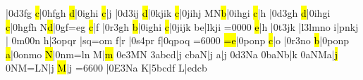 \temps\notes\hpause|\Ilegl0d\dqh3fg\enotes
\temps\notes{}\hl c|\qqh0hfgh\enotes
\xbarre\notes{}\hl d|\qqh0ighi\enotes
\temps\notes{}\hl c|\qu j\sk\enotes
\temps\notes|\Ilegl0d\dqh3ij\enotes
\xbarre\notes{}\hl d|\qqh0kjik\enotes
\temps\notes{}\hl c|\qqh0jihj\enotes
\xbarre\notes\zh M\lh N\hl b|\qqh0ihgi\enotes
\temps\notes{}\hl c|\qu h\enotes
\temps\notes|\Ilegl0d\dqh3gh\enotes
\alaligne\notes{}\hl d|\qqh0ihgi\enotes
\temps\notes{}\hl c|\qqh0hgfh\enotes
\barre\notes{}\lh N\hl d|\qqh0gf{=e}g\enotes
\temps\notes{}\hl c|\qu f\sk\enotes
\temps\notes|\Ilegu0r\dqh3gh\enotes
\barre\notes{}\hl b|\qqh0ighi\enotes
\temps\notes{}\hl c|\qqh0jijk\enotes
\barre\notes\zh b\bohl e|lkji\enotes
\cleftoksi={{0}{0}{0}{0}}\changeclefs
\temps\notes{}\hl e|\qu h\sk\enotes
\temps\notes|\Ilegu0t\dqh3jk\enotes
\alaligne\notes{}|\na l\qqb3lmno\enotes
\temps\notes{}\hu i|pnkj\enotes
\barre\nspace\notes{}|\relax
   \ibl0m0\tqb0n\enotes
\temps\notes{}\hu h|\qqb3opqr\enotes
\xbarre\notes{}|sq{=o}m\enotes
\temps\notes{}\hu f|\ql r\enotes
\temps\notes|\Ilegu0s\dqb4pr\enotes
\xbarre\notes{}\hu f|\qqB0qpoq\enotes
\cleftoksi={{6}{0}{0}{0}}\changeclefs
\temps\notes{}\hl{=e}|\qqB0ponp\enotes
\changecontexte
\Notes{}\hl c|\ql o\enotes
\temps\notes|\Ilegu0r\dqb3no\enotes
\temps\notes{}\hl b|\qqB0ponp\enotes
\temps\notes{}\hl a|\qqB0onmo\enotes
\generalmeter{\allabreve}\changecontexte
\notes{}\hl N|\qqB0nm{=l}n\enotes
\temps\Notes\boqu M|\hl m\enotes
\temps\notes{}\Ilegu0e\dqb3MN\enotes
\xbarre\notes\qqb3abcd|\hu j\enotes
\temps\notes{}cbaN|\hu j\enotes
\xbarre\Notes{}\ql a|\hu j\enotes
\temps\notes\Ilegu0d\dqb3Na\enotes
\temps\notes\qqb0baNb|\hu k\enotes%
\alaligne\notes\qqB0aNMa|\hl j\enotes
\temps\notes\qqB0NM{=L}N|\hu j\enotes
\barre\notes{}\hl M|\hu j\enotes
\cleftoksi={{6}{6}{0}{0}}\changeclefs
\notes|\Ilegl0E\dqh3Na\enotes
\temps\notes\bohu K|\qqh5bcdf\enotes
\barre\notes\bohu L|edcb\enotes

